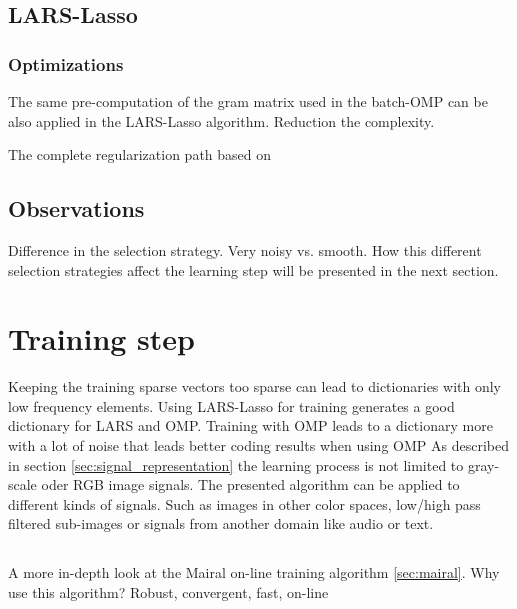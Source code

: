 \subsection{LARS-Lasso}
\subsubsection*{Optimizations}
The same pre-computation of the gram matrix used in the batch-OMP can be
also applied in the LARS-Lasso algorithm. Reduction the complexity. %

The complete regularization path based on\cite{Efron2004}

\subsection{Observations}
Difference in the selection strategy.
Very noisy vs. smooth. 
How this different selection strategies affect the learning step will be
presented in the next section.


\section{Training step}
Keeping the training sparse vectors too sparse can lead to dictionaries with
only low frequency elements. Using LARS-Lasso for training generates a good
dictionary for LARS and OMP. Training with OMP leads to a dictionary more with a
lot of noise that leads better coding results when using OMP 
As described in section \ref{sec:signal_representation} the learning process is
not limited to gray-scale oder RGB image signals. The presented algorithm can be
applied to different kinds of signals. Such as images in other color
spaces, low/high pass filtered sub-images or signals from another domain like
audio or text. 


\subsection{\trainDL}
A more in-depth look at the Mairal on-line training algorithm \ref{sec:mairal}. 
Why use this algorithm? Robust, convergent, fast, on-line

